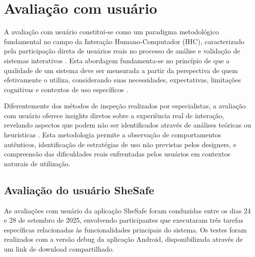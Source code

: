 \section{Avaliação com usuário}
A avaliação com usuário constitui-se como um paradigma metodológico fundamental no campo da Interação Humano-Computador (IHC), caracterizado pela participação direta de usuários reais no processo de análise e validação de sistemas interativos \cite{dix2003human}. Esta abordagem fundamenta-se no princípio de que a qualidade de um sistema deve ser mensurada a partir da perspectiva de quem efetivamente o utiliza, considerando suas necessidades, expectativas, limitações cognitivas e contextos de uso específicos \cite{preece2015interaction}.

Diferentemente dos métodos de inspeção realizados por especialistas, a avaliação com usuário oferece insights diretos sobre a experiência real de interação, revelando aspectos que podem não ser identificados através de análises teóricas ou heurísticas \cite{nielsen1994usability}. Esta metodologia permite a observação de comportamentos autênticos, identificação de estratégias de uso não previstas pelos designers, e compreensão das dificuldades reais enfrentadas pelos usuários em contextos naturais de utilização.

\subsection{Avaliação do usuário SheSafe}
As avaliações com usuário da aplicação SheSafe foram conduzidas entre os dias 24 e 28 de setembro de 2025, envolvendo participantes que executaram três tarefas específicas relacionadas às funcionalidades principais do sistema. Os testes foram realizados com a versão debug da aplicação Android, disponibilizada através de um link de download compartilhado.

